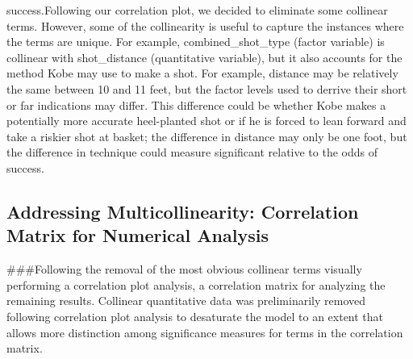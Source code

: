 \documentclass[]{article}
\begin{document}
{{{success.}{Following our correlation plot, we decided to eliminate some collinear terms. However, some of the collinearity is useful to capture the instances where the terms are unique. For example, combined\_shot\_type (factor variable) is collinear with shot\_distance (quantitative variable), but it also accounts for the method Kobe may use to make a shot. For example, distance may be relatively the same between 10 and 11 feet, but the factor levels used to derrive their short or far indications may differ. This difference could be whether Kobe makes a potentially more accurate heel-planted shot or if he is forced to lean forward and take a riskier shot at basket; the difference in distance may only be one foot, but the difference in technique could measure significant relative to the odds of success.}}\label{following-our-correlation-plot-we-decided-to-eliminate-some-collinear-terms.-however-some-of-the-collinearity-is-useful-to-capture-the-instances-where-the-terms-are-unique.-for-example-combined_shot_type-factor-variable-is-collinear-with-shot_distance-quantitative-variable-but-it-also-accounts-for-the-method-kobe-may-use-to-make-a-shot.-for-example-distance-may-be-relatively-the-same-between-10-and-11-feet-but-the-factor-levels-used-to-derrive-their-short-or-far-indications-may-differ.-this-difference-could-be-whether-kobe-makes-a-potentially-more-accurate-heel-planted-shot-or-if-he-is-forced-to-lean-forward-and-take-a-riskier-shot-at-basket-the-difference-in-distance-may-only-be-one-foot-but-the-difference-in-technique-could-measure-significant-relative-to-the-odds-of-success.}}

\hypertarget{addressing-multicollinearity-correlation-matrix-for-numerical-analysis}{%
\subsection{\texorpdfstring{\textbf{Addressing Multicollinearity:
Correlation Matrix for Numerical
Analysis}}{Addressing Multicollinearity: Correlation Matrix for Numerical Analysis}}\label{addressing-multicollinearity-correlation-matrix-for-numerical-analysis}}

\#\#\#Following the removal of the most obvious collinear terms visually
performing a correlation plot analysis, a correlation matrix for
analyzing the remaining results. Collinear quantitative data was
preliminarily removed following correlation plot analysis to desaturate
the model to an extent that allows more distinction among significance
measures for terms in the correlation matrix.
\end{document}
